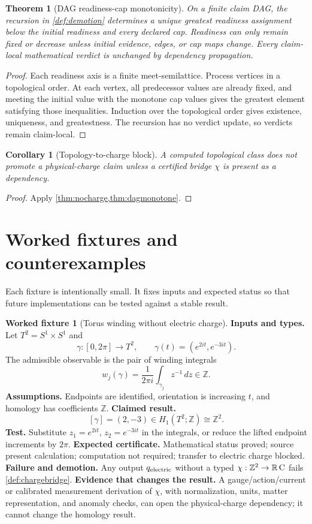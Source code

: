 \documentclass[11pt,a4paper]{article}
\theoremstyle{definition}
\newtheorem{fixture}[definition]{Worked fixture}
\theoremstyle{plain}
\newtheorem{theorem}[definition]{Theorem}
\newtheorem{corollary}[definition]{Corollary}
\theoremstyle{remark}
\begin{document}
\begin{theorem}[DAG readiness-cap monotonicity]\label{thm:dagmonotone}
On a finite claim DAG, the recursion in \cref{def:demotion} determines a
unique greatest readiness assignment below the initial readiness and every
declared cap.  Readiness can only remain fixed or decrease unless initial
evidence, edges, or cap maps change.  Every claim-local mathematical verdict
is unchanged by dependency propagation.
\end{theorem}
\begin{proof}
Each readiness axis is a finite meet-semilattice.  Process vertices in a
topological order.  At each vertex, all predecessor values are already fixed,
and meeting the initial value with the monotone cap values gives the greatest
element satisfying those inequalities.  Induction over the topological order
gives existence, uniqueness, and greatestness.  The recursion has no verdict
update, so verdicts remain claim-local.
\end{proof}

\begin{corollary}[Topology-to-charge block]
A computed topological class does not promote a physical-charge claim unless a
certified bridge \(\chi\) is present as a dependency.
\end{corollary}
\begin{proof}
Apply \cref{thm:nocharge,thm:dagmonotone}.
\end{proof}

\section{Worked fixtures and counterexamples}\label{sec:fixtures}

Each fixture is intentionally small.  It fixes inputs and expected status so
that future implementations can be tested against a stable result.

\begin{fixture}[Torus winding without electric charge]\label{fix:torus}
\textbf{Inputs and types.}
Let \(T^2=S^1\times S^1\) and
\[
\gamma:[0,2\pi]\to T^2,\qquad
\gamma(t)=(e^{2it},e^{-3it}).
\]
The admissible observable is the pair of winding integrals
\[
w_j(\gamma)=\frac{1}{2\pi i}\int_{\gamma_j}z^{-1}\,dz\in\mathbb Z.
\]
\textbf{Assumptions.}  Endpoints are identified, orientation is increasing
\(t\), and homology has coefficients \(\mathbb Z\).
\textbf{Claimed result.}
\[
[\gamma]=(2,-3)\in H_1(T^2;\mathbb Z)\cong\mathbb Z^2.
\]
\textbf{Test.}  Substitute \(z_1=e^{2it}\), \(z_2=e^{-3it}\) in the integrals,
or reduce the lifted endpoint increments by \(2\pi\).
\textbf{Expected certificate.}  Mathematical status proved; source present
calculation; computation not required; transfer to electric charge blocked.
\textbf{Failure and demotion.}  Any output \(q_{\rm electric}\) without a typed
\(\chi:\mathbb Z^2\to\mathbb R\,{\rm C}\) fails
\cref{def:chargebridge}.  \textbf{Evidence that changes the result.}  A
gauge/action/current or calibrated measurement derivation of \(\chi\), with
normalization, units, matter representation, and anomaly checks, can open the
physical-charge dependency; it cannot change the homology result.
\end{fixture}
\end{document}
